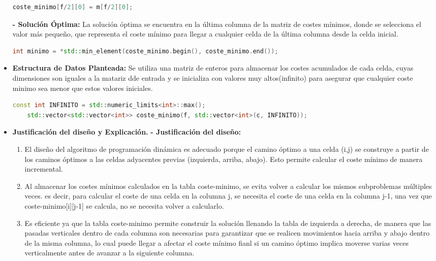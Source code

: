 \documentclass[12pt, letterpaper]{article}
\begin{document}
\begin{itemize}
\begin{lstlisting}[language=C++, basicstyle=\ttfamily\footnotesize]
              coste_minimo[f/2][0] = m[f/2][0];
            \end{lstlisting}
          \subitem\textbf{- Solución Óptima:}
            La solución óptima se encuentra en la última columna de la matriz de costes mínimos, 
            donde se selecciona el valor más pequeño, que representa el coste mínimo para llegar a cualquier celda de la última columna desde la celda inicial.
            \begin{lstlisting}[language=C++, basicstyle=\ttfamily\footnotesize,breaklines=true]
int minimo = *std::min_element(coste_minimo.begin(), coste_minimo.end());
            \end{lstlisting}
        \item \textbf{Estructura de Datos Planteada:}
          Se utiliza una matriz de enteros para almacenar los costes acumulados de cada celda, cuyas dimensiones son iguales a la matariz dde entrada
          y se inicializa con valores muy altos(infinito) para asegurar que cualquier coste minimo sea menor que estos valores iniciales.
          \begin{lstlisting}[language=C++, basicstyle=\ttfamily\footnotesize,breaklines=true]
    const int INFINITO = std::numeric_limits<int>::max();
    std::vector<std::vector<int>> coste_minimo(f, std::vector<int>(c, INFINITO));
          \end{lstlisting}
        \item \textbf{Justificación del diseño y Explicación.}
          \subitem\textbf{- Justificación del diseño:}
            \begin{enumerate}
              \item El diseño del algoritmo de programación dinámica es adecuado porque el camino óptimo a una celda (i,j) se construye a partir de los caminos óptimos a las celdas adyacentes previas (izquierda, arriba, abajo). 
            Esto permite calcular el coste mínimo de manera incremental.
              \item Al almacenar los costes mínimos calculados en la tabla coste-minimo, se evita volver a calcular los mismos subproblemas múltiples veces. 
              es decir, para calcular el coste de una celda en la columna j, se necesita el coste de una celda en la columna j-1, 
              una vez que coste-minimo[i][j-1] se calcula, no se necesita volver a calcularlo.
              \item Es eficiente ya que la tabla coste-minimo permite construir la solución llenando la tabla de izquierda a derecha, 
              de manera que las pasadas verticales dentro de cada columna son necesarias para garantizar que se realicen movimientos hacia arriba y abajo dentro de la misma columna, 
              lo cual puede llegar a afectar el coste mínimo fianl si un camino óptimo implica moverse varias veces verticalmente antes de avanzar a la siguiente columna.
            \end{enumerate}
            

\end{itemize}
\end{document}
